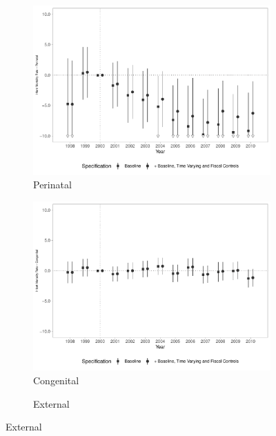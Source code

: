 \begin{figure}[h!]
\begin{center}
    \begin{subfigure}{0.32\textwidth}
        \centering
        \caption{\scriptsize Perinatal}\label{fig:17c}
        \includegraphics[width=\textwidth]{plots/tx_mi_perinat_dist_ec29_baseline_dist_ec29_baseline_17.pdf}
    \end{subfigure}
        \begin{subfigure}{0.32\textwidth}
        \centering
        \caption{\scriptsize Congenital}\label{fig:17d}
        \includegraphics[width=\textwidth]{plots/tx_mi_cong_dist_ec29_baseline_dist_ec29_baseline_17.pdf}
    \end{subfigure}
        \begin{subfigure}{0.32\textwidth}
        \centering
        \caption{\scriptsize External}\label{fig:17e}

\end{subfigure}
\end{center}
\end{figure}
